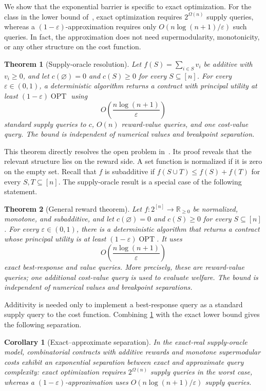 \documentclass[11pt]{article}
\newtheorem{theorem}{Theorem}
\newtheorem{corollary}[corollary]{Corollary}
\newcommand{\OPT}{\operatorname{OPT}}
\newcommand{\eps}{\varepsilon}
\begin{document}
We show that the exponential barrier is specific to exact optimization.
For the class in the lower bound of~\cite{DFGR26}, exact
optimization requires $2^{\Omega(n)}$ supply queries, whereas a
$(1-\eps)$-approximation requires only
$O(n\log(n+1)/\eps)$ such queries.  In fact, the approximation does not need
supermodularity, monotonicity, or any other structure on the cost function.

\begin{theorem}[Supply-oracle resolution]\label{thm:supply}
Let $f(S)=\sum_{i\in S}v_i$ be additive with $v_i\geq0$, and let
$c(\varnothing)=0$ and $c(S)\geq0$ for every $S\subseteq[n]$.  For every
$\eps\in(0,1)$, a deterministic algorithm returns a contract with principal
utility at least $(1-\eps)\OPT$ using
\[
          O\!\left(\frac{n\log(n+1)}{\eps}\right)
\]
standard supply queries to $c$, $O(n)$ reward-value queries, and one
cost-value query.  The bound is independent of numerical values and
breakpoint separation.
\end{theorem}

This theorem directly resolves the open problem in~\cite{DFGR26}.  Its
proof reveals that the relevant structure lies on
the reward side.  A set function is normalized if it is zero on the empty
set.  Recall that $f$ is subadditive if
$f(S\cup T)\leq f(S)+f(T)$ for every $S,T\subseteq[n]$.
The supply-oracle result is a special case of the following statement.

\begin{theorem}[General reward theorem]\label{thm:general}
Let $f:2^{[n]}\to\mathbb{R}_{\geq0}$ be normalized, monotone, and
subadditive, and let $c(\varnothing)=0$ and $c(S)\geq0$ for every
$S\subseteq[n]$.  For every $\eps\in(0,1)$, there is a deterministic
algorithm that returns a contract whose principal utility is at least
$(1-\eps)\OPT$.  It uses
\[
          O\!\left(\frac{n\log(n+1)}{\eps}\right)
\]
exact best-response and value queries.
More precisely, these are reward-value queries; one additional cost-value
query is used to evaluate welfare.
The bound is independent of numerical values and breakpoint separations.
\end{theorem}

Additivity is needed only to implement a best-response query as a standard
supply query to the cost function.  Combining \cref{thm:supply} with the
exact lower bound gives the following separation.

\begin{corollary}[Exact--approximate separation]\label{cor:separation}
In the exact-real supply-oracle model, combinatorial contracts with additive
rewards and monotone supermodular costs exhibit an exponential separation
between exact and approximate query complexity: exact optimization requires
$2^{\Omega(n)}$ supply queries in the worst case, whereas a
$(1-\eps)$-approximation uses
$O(n\log(n+1)/\eps)$ supply queries.
\end{corollary}
\end{document}
